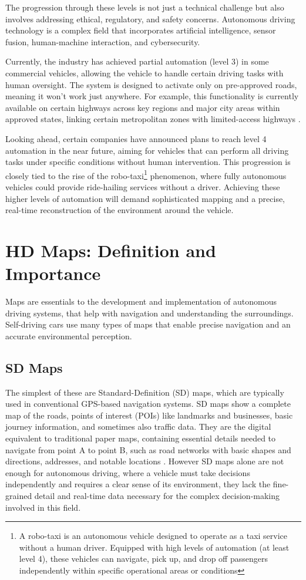The progression through these levels is not just a technical challenge but also involves addressing ethical, regulatory, and safety concerns. Autonomous driving technology is a complex field that incorporates artificial intelligence, sensor fusion, human-machine interaction, and cybersecurity. 

Currently, the industry has achieved partial automation (level 3) in some commercial vehicles, allowing the vehicle to handle certain driving tasks with human oversight. The system is designed to activate only on pre-approved roads, meaning it won’t work just anywhere. For example, this functionality is currently available on certain highways across key regions and major city areas within approved states, linking certain metropolitan zones with limited-access highways \cite{bmw2024}.

Looking ahead, certain companies have announced plans to reach level 4 automation in the near future, aiming for vehicles that can perform all driving tasks under specific conditions without human intervention. This progression is closely tied to the rise of the robo-taxi\footnote{A robo-taxi is an autonomous vehicle designed to operate as a taxi service without a human driver. Equipped with high levels of automation (at least level 4), these vehicles can navigate, pick up, and drop off passengers independently within specific operational areas or conditions} phenomenon, where fully autonomous vehicles could provide ride-hailing services without a driver. Achieving these higher levels of automation will demand sophisticated mapping and a precise, real-time reconstruction of the environment around the vehicle.

\section{HD Maps: Definition and Importance}

Maps are essentials to the development and implementation of autonomous driving systems, that help with navigation and understanding the surroundings. Self-driving cars use many types of maps that enable precise navigation and an accurate environmental perception. 

\subsection{SD Maps}
The simplest of these are Standard-Definition (SD) maps, which are typically used in conventional GPS-based navigation systems. SD maps show a complete map of the roads, points of interest (POIs) like landmarks and businesses, basic journey information, and sometimes also traffic data. They are the digital equivalent to traditional paper maps, containing essential details needed to navigate from point A to point B, such as road networks with basic shapes and directions, addresses, and notable locations \cite{Mudduluru_SD_vs_HD_Maps, Chiang2021}.
However SD maps alone are not enough for autonomous driving, where a vehicle must take decisions independently and requires a clear sense of its environment, they lack the fine-grained detail and real-time data necessary for the complex decision-making involved in this field.

